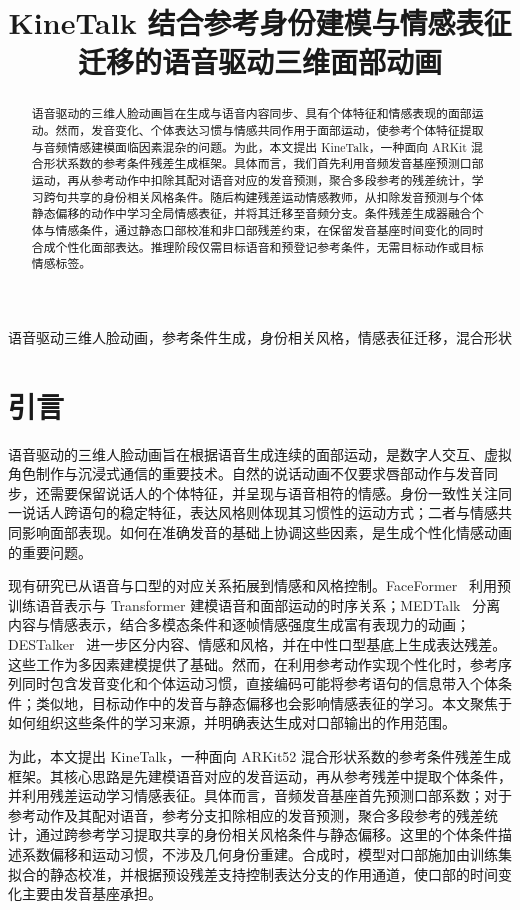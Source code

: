 \documentclass[conference]{IEEEtran}
\title{KineTalk 结合参考身份建模与情感表征迁移的语音驱动三维面部动画}
\author{\IEEEauthorblockN{作者姓名}
\IEEEauthorblockA{\textit{学院或研究机构}\\
城市，国家\\
email@example.com}}
\begin{document}
\maketitle

\begin{abstract}
语音驱动的三维人脸动画旨在生成与语音内容同步、具有个体特征和情感表现的面部运动。然而，发音变化、个体表达习惯与情感共同作用于面部运动，使参考个体特征提取与音频情感建模面临因素混杂的问题。为此，本文提出 KineTalk，一种面向 ARKit 混合形状系数的参考条件残差生成框架。具体而言，我们首先利用音频发音基座预测口部运动，再从参考动作中扣除其配对语音对应的发音预测，聚合多段参考的残差统计，学习跨句共享的身份相关风格条件。随后构建残差运动情感教师，从扣除发音预测与个体静态偏移的动作中学习全局情感表征，并将其迁移至音频分支。条件残差生成器融合个体与情感条件，通过静态口部校准和非口部残差约束，在保留发音基座时间变化的同时合成个性化面部表达。推理阶段仅需目标语音和预登记参考条件，无需目标动作或目标情感标签。
\end{abstract}

\begin{IEEEkeywords}
语音驱动三维人脸动画，参考条件生成，身份相关风格，情感表征迁移，混合形状
\end{IEEEkeywords}

\section{引言}
语音驱动的三维人脸动画旨在根据语音生成连续的面部运动，是数字人交互、虚拟角色制作与沉浸式通信的重要技术。自然的说话动画不仅要求唇部动作与发音同步，还需要保留说话人的个体特征，并呈现与语音相符的情感。身份一致性关注同一说话人跨语句的稳定特征，表达风格则体现其习惯性的运动方式；二者与情感共同影响面部表现。如何在准确发音的基础上协调这些因素，是生成个性化情感动画的重要问题。

现有研究已从语音与口型的对应关系拓展到情感和风格控制。FaceFormer~\cite{faceformer} 利用预训练语音表示与 Transformer 建模语音和面部运动的时序关系；MEDTalk~\cite{medtalk} 分离内容与情感表示，结合多模态条件和逐帧情感强度生成富有表现力的动画；DESTalker~\cite{destalker} 进一步区分内容、情感和风格，并在中性口型基底上生成表达残差。这些工作为多因素建模提供了基础。然而，在利用参考动作实现个性化时，参考序列同时包含发音变化和个体运动习惯，直接编码可能将参考语句的信息带入个体条件；类似地，目标动作中的发音与静态偏移也会影响情感表征的学习。本文聚焦于如何组织这些条件的学习来源，并明确表达生成对口部输出的作用范围。

为此，本文提出 KineTalk，一种面向 ARKit52 混合形状系数的参考条件残差生成框架。其核心思路是先建模语音对应的发音运动，再从参考残差中提取个体条件，并利用残差运动学习情感表征。具体而言，音频发音基座首先预测口部系数；对于参考动作及其配对语音，参考分支扣除相应的发音预测，聚合多段参考的残差统计，通过跨参考学习提取共享的身份相关风格条件与静态偏移。这里的个体条件描述系数偏移和运动习惯，不涉及几何身份重建。合成时，模型对口部施加由训练集拟合的静态校准，并根据预设残差支持控制表达分支的作用通道，使口部的时间变化主要由发音基座承担。
\end{document}
